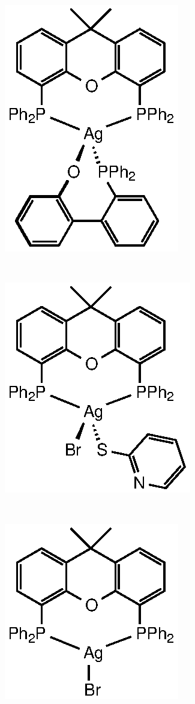 \begin{figure}[htbp]
\centering
\begin{subfigure}[b]{0.3\textwidth}
	\centering
	\includegraphics{../Figures/AgxantphosPO.eps}
	\caption{}
	\label{AgxantphosPO}
\end{subfigure}
~
\begin{subfigure}[b]{0.3\textwidth}
	\centering
	\includegraphics{../Figures/AgxantphosBrSPy.eps}
	\caption{}
	\label{AgxantphosBrSPy}
\end{subfigure}
~
\begin{subfigure}[b]{0.3\textwidth}
	\centering
	\includegraphics{../Figures/AgxantphosBr.eps}

\end{subfigure}
\end{figure}
